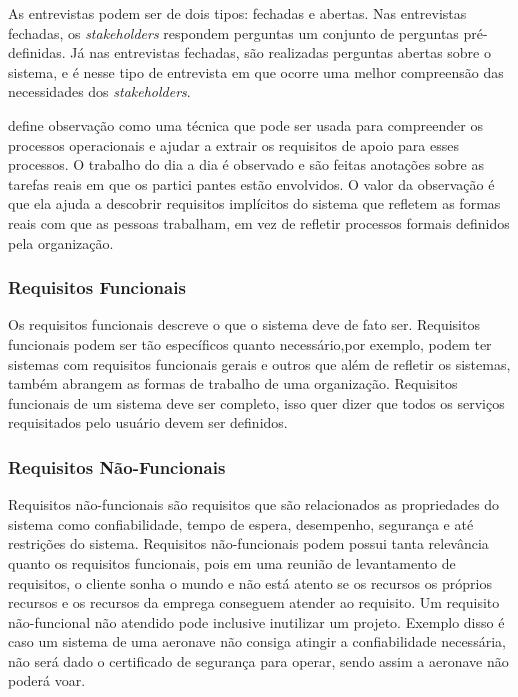 As entrevistas podem ser de dois tipos: fechadas e abertas. Nas entrevistas fechadas, os \textit{stakeholders} respondem perguntas um conjunto de perguntas pré-definidas. Já nas entrevistas fechadas, são realizadas perguntas abertas sobre o sistema, e é nesse tipo de entrevista em que ocorre uma melhor compreensão das necessidades dos \textit{stakeholders}.  

\label{sec:observacao}

\cite{sommerville} define observação como uma técnica que pode ser usada para compreender os processos operacionais e ajudar a extrair os requisitos de apoio para esses processos. O trabalho do dia a dia é observado e são feitas anotações sobre as tarefas reais em que os partici­
pantes estão envolvidos. O valor da observação é que ela ajuda a descobrir requisitos implícitos do sistema que refletem as formas reais com que as pessoas trabalham, em vez de refletir processos formais definidos pela organização.

\subsubsection{Requisitos Funcionais}
\label{sec:requisitos_funcionais}

Os requisitos funcionais descreve o que o sistema deve de fato ser. Requisitos funcionais podem ser tão específicos quanto necessário,por exemplo, podem ter sistemas com requisitos funcionais gerais e outros que além de refletir os sistemas, também abrangem as formas de trabalho de uma organização. Requisitos funcionais de um sistema deve ser completo, isso quer dizer que todos os serviços requisitados pelo usuário devem ser definidos.

\subsubsection{Requisitos Não-Funcionais}
\label{sec:requisitos_nao_funcionais}

Requisitos não-funcionais são requisitos que são relacionados as propriedades do sistema como confiabilidade, tempo de espera, desempenho, segurança e até restrições do sistema. Requisitos não-funcionais podem possui tanta relevância quanto os requisitos funcionais, pois em uma reunião de levantamento de requisitos, o cliente sonha o mundo e não está atento se os recursos os próprios recursos e os recursos da emprega conseguem atender ao requisito. Um requisito não-funcional não atendido pode inclusive inutilizar um projeto. Exemplo disso é caso um sistema de uma aeronave não consiga atingir a confiabilidade necessária, não será dado o certificado de segurança para operar, sendo assim a aeronave não poderá voar.

